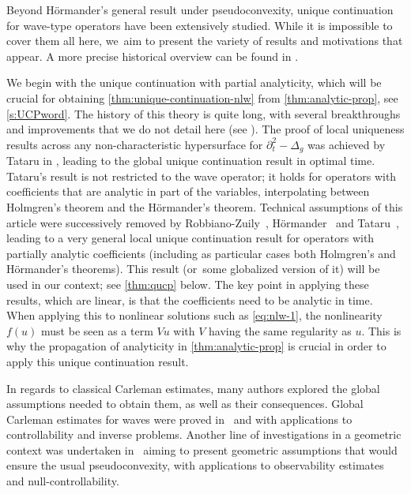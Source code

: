 \documentclass[10pt]{amsart}
\theoremstyle{definition}
\begin{document}
Beyond Hörmander's general result \cite{H:63} under pseudoconvexity, unique continuation for wave-type operators have been extensively studied. While it is impossible to cover them all here, we~aim to present the variety of results and motivations that appear. A more precise historical overview can be found in \cite[\S 4]{LL:23Lecture}.

We begin with the unique continuation with partial analyticity, which will be crucial for obtaining \cref{thm:unique-continuation-nlw} from \cref{thm:analytic-prop}, see \cref{s:UCPword}. The history of this theory is quite long, with several breakthroughs and improvements that we do not detail here (see \cite[\S 4]{LL:23Lecture}). The proof of local uniqueness results across any non-characteristic hypersurface for $\partial_t^2 - \Delta_g$ was achieved by Tataru in \cite{Tat95}, leading to the global unique continuation result in optimal time. Tataru's result is not restricted to the wave operator;
it holds for operators with coefficients that are analytic in part of the variables, interpolating between Holmgren's theorem and the Hörmander's theorem. Technical assumptions of this article were successively removed by Robbiano-Zuily~\cite{RZ:98}, Hörmander~\cite{Hor:97} and Tataru~\cite{Tat99}, leading to a very general local unique continuation result for operators with partially analytic coefficients (including as particular cases both Holmgren's and Hörmander's theorems). This result (or~some globalized version of it) will be used in our context; see \cref{thm:qucp} below. The key point in applying these results, which are linear, is that the coefficients need to be analytic in time. When applying this to nonlinear solutions such as \eqref{eq:nlw-1}, the nonlinearity $f(u)$ must be seen as a term $Vu$ with $V$ having the same regularity as $u$. This is why the propagation of analyticity in \cref{thm:analytic-prop} is crucial in order to apply this unique continuation result.

In regards to classical Carleman estimates, many authors explored the global assumptions needed to obtain them, as well as their consequences. Global Carleman estimates for waves were proved in~\cite[Ch.\,4]{FI:96} and \cite{BDBE:13} with applications to controllability and inverse problems. Another line of investigations in a geometric context was undertaken in~\cite{DZZ:08,Shao:19,JS:24} aiming to present geometric assumptions that would ensure the usual pseudoconvexity, with applications to observability estimates and null-controllability.
\end{document}
